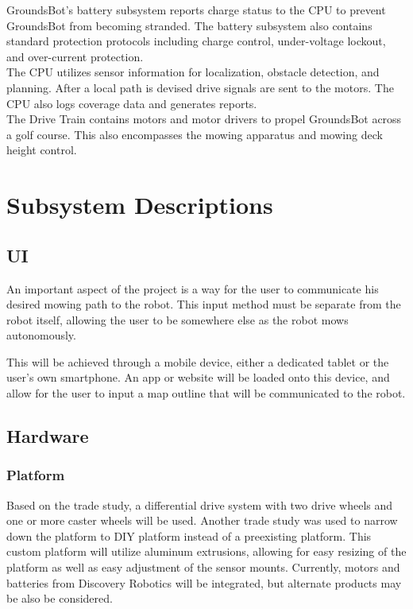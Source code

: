 \documentclass{article}
\begin{document}
  GroundsBot's battery subsystem reports charge status to the CPU to prevent GroundsBot from becoming stranded. The battery subsystem also contains standard protection protocols including charge control, under-voltage lockout, and over-current protection. \\

  The CPU utilizes sensor information for localization, obstacle detection, and planning.  After a local path is devised drive signals are sent to the motors. The CPU also logs coverage data and generates reports.\\

  The Drive Train contains motors and motor drivers to propel GroundsBot across a golf course.  This also encompasses the mowing apparatus and mowing deck height control. \\



\section{Subsystem Descriptions}
	\subsection{UI}
	An important aspect of the project is a way for the user to communicate his desired mowing path to the robot. This input method must be separate from the robot itself, allowing the user to be somewhere else as the robot mows autonomously. 
	
	This will be achieved through a mobile device, either a dedicated tablet or the user's own smartphone. An app or website will be loaded onto this device, and allow for the user to input a map outline that will be communicated to the robot. 
	
	\subsection{Hardware}
		\subsubsection{Platform}
			Based on the trade study, a differential drive system with two drive wheels and one or more caster wheels will be used. Another trade study was used to narrow down the platform to DIY platform instead of a preexisting platform. This custom platform will utilize aluminum extrusions, allowing for easy resizing of the platform as well as easy adjustment of the sensor mounts. Currently, motors and batteries from Discovery Robotics will be integrated, but alternate products may be also be considered. 
			
\end{document}
